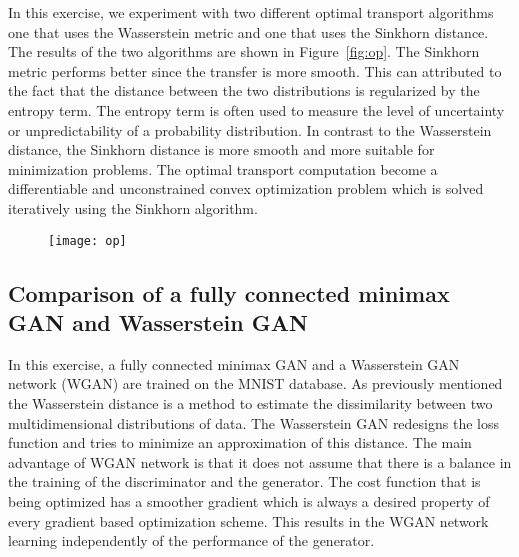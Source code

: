 \documentclass[conference,compsoc]{IEEEtran}
\begin{document}
In this exercise, we experiment with two different optimal transport algorithms one that uses the Wasserstein metric and one that uses the 
Sinkhorn distance. The results of the two algorithms are shown in Figure~\ref{fig:op}. The Sinkhorn metric performs better since the transfer is more smooth. This can attributed to the fact that the distance between the two distributions is regularized by the entropy term. The entropy term is often used to measure the level of uncertainty or unpredictability of a probability distribution. In contrast to the Wasserstein distance, the Sinkhorn distance is more smooth and more suitable for minimization problems. The optimal transport computation become a differentiable and unconstrained convex optimization problem which is solved iteratively using the Sinkhorn algorithm.

    \begin{figure*}[]
        \centering
        \begin{subfigure}{0.50\linewidth}
            \texttt{[image: op]}
   
        \end{subfigure}	        
        \caption{Color transfer with Wasserstein and Sinkhorn algorithms}
        \label{fig:op}
\end{figure*}

\subsection{Comparison of a fully connected minimax GAN and Wasserstein GAN}
In this exercise, a fully connected minimax GAN and a Wasserstein GAN network (WGAN) are trained on the MNIST database. As previously mentioned the Wasserstein distance is a method to estimate the dissimilarity between two multidimensional distributions of data. The Wasserstein GAN redesigns the loss function and tries to minimize an approximation of this distance. The main advantage of WGAN network is that it does not assume that there is a balance in the training of the discriminator and the generator. The cost function that is being optimized has a smoother gradient which is always a desired property of every gradient based optimization scheme. This results in the WGAN network learning independently of the performance of the generator. 
\end{document}
